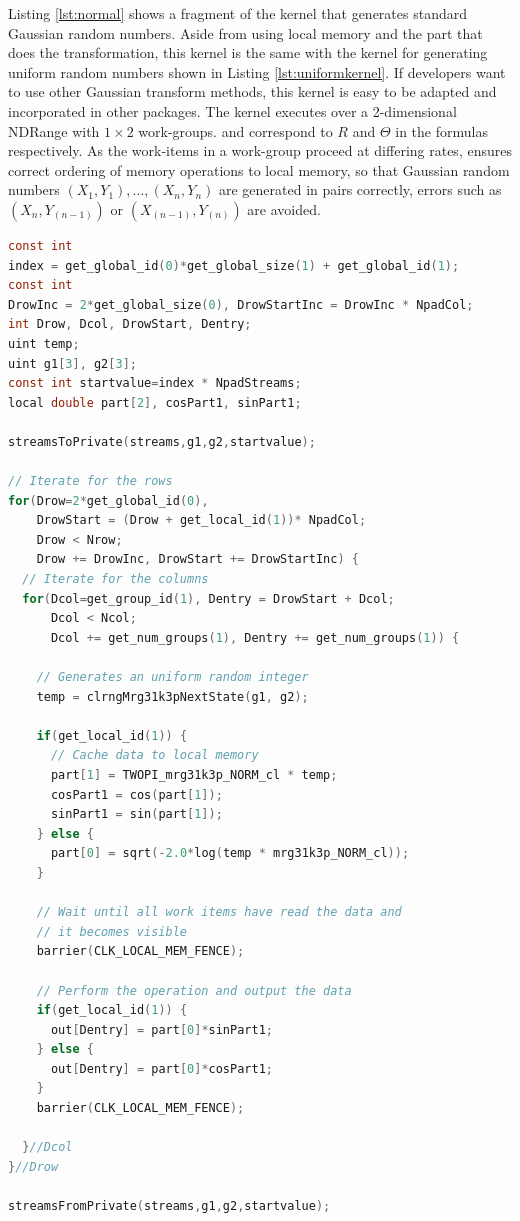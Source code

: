 \documentclass[article,nojss]{jss}\usepackage[]{graphicx}\usepackage[]{color}
\begin{document}
Listing \ref{lst:normal} shows a fragment of the kernel that generates standard Gaussian random numbers. Aside from using local memory and the part that does the transformation, this kernel is the same with the kernel for generating uniform random numbers shown in Listing \ref{lst:uniformkernel}. If developers want to use other Gaussian transform methods, this kernel is easy to be adapted and incorporated in other  packages. The kernel executes over a 2-dimensional NDRange with $1 \times 2$ work-groups.  and  correspond to $R$ and $\Theta$ in the formulas respectively. As the work-items in a work-group proceed at differing rates,  ensures correct ordering of memory operations to local memory, so that Gaussian random numbers $(X_1,Y_1), \dots, (X_n,Y_n)$ are generated in pairs correctly, errors such as $(X_n, Y_{(n-1)})$ or $(X_{(n-1)}, Y_{(n)})$ are avoided.
%
\begin{framed}
\begin{lstlisting}[language=C,basicstyle=\small,label={lst:normal}]
const int 
index = get_global_id(0)*get_global_size(1) + get_global_id(1);
const int 
DrowInc = 2*get_global_size(0), DrowStartInc = DrowInc * NpadCol;
int Drow, Dcol, DrowStart, Dentry;
uint temp;
uint g1[3], g2[3];
const int startvalue=index * NpadStreams;
local double part[2], cosPart1, sinPart1;

streamsToPrivate(streams,g1,g2,startvalue);

// Iterate for the rows
for(Drow=2*get_global_id(0), 
    DrowStart = (Drow + get_local_id(1))* NpadCol;
    Drow < Nrow; 
    Drow += DrowInc, DrowStart += DrowStartInc) {
  // Iterate for the columns
  for(Dcol=get_group_id(1), Dentry = DrowStart + Dcol;
      Dcol < Ncol;
      Dcol += get_num_groups(1), Dentry += get_num_groups(1)) {
    
    // Generates an uniform random integer
    temp = clrngMrg31k3pNextState(g1, g2);
    
    if(get_local_id(1)) {
      // Cache data to local memory
      part[1] = TWOPI_mrg31k3p_NORM_cl * temp;
      cosPart1 = cos(part[1]);
      sinPart1 = sin(part[1]);
    } else {
      part[0] = sqrt(-2.0*log(temp * mrg31k3p_NORM_cl));
    }
    
    // Wait until all work items have read the data and 
    // it becomes visible
    barrier(CLK_LOCAL_MEM_FENCE);
    
    // Perform the operation and output the data
    if(get_local_id(1)) {
      out[Dentry] = part[0]*sinPart1;
    } else {
      out[Dentry] = part[0]*cosPart1;
    }
    barrier(CLK_LOCAL_MEM_FENCE);
    
  }//Dcol
}//Drow

streamsFromPrivate(streams,g1,g2,startvalue);
\end{lstlisting}
\end{framed}
\end{document}
